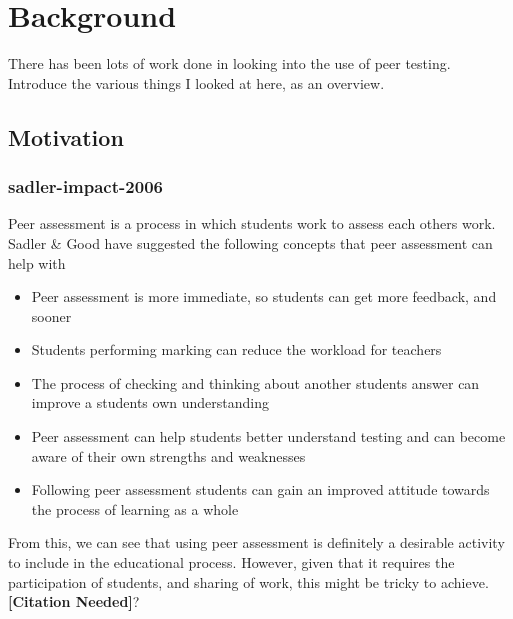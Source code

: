 \documentclass[a4paper,11pt]{report}
\newcommand{\cn}{\textbf{[Citation Needed]}}
\begin{document}
\chapter{Background}
There has been lots of work done in looking into the use of peer testing. Introduce the various things I looked at here, as an overview.
\section{Motivation}
\subsection{sadler-impact-2006}
Peer assessment is a process in which students work to assess each others work. Sadler \& Good \cite{sadler_impact_2006} have suggested the following concepts that peer assessment can help with
\begin{itemize}
 \item Peer assessment is more immediate, so students can get more feedback, and sooner
 \item Students performing marking can reduce the workload for teachers
 \item The process of checking and thinking about another students answer can improve a students own understanding
 \item Peer assessment can help students better understand testing and can become aware of their own strengths and weaknesses
 \item Following peer assessment students can gain an improved attitude towards the process of learning as a whole
\end{itemize}
From this, we can see that using peer assessment is definitely a desirable activity to include in the educational process. However, given that it requires the participation of students, and sharing of work, this might be tricky to achieve.\cn?
\end{document}
